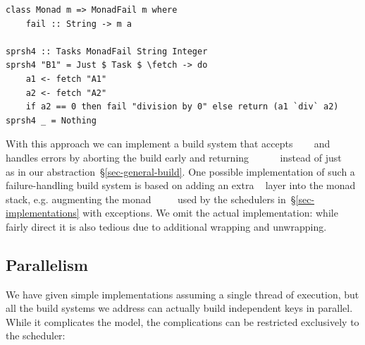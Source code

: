\vspace{1mm}
\begin{verbatim}
class Monad m => MonadFail m where
    fail :: String -> m a

sprsh4 :: Tasks MonadFail String Integer
sprsh4 "B1" = Just $ Task $ \fetch -> do
    a1 <- fetch "A1"
    a2 <- fetch "A2"
    if a2 == 0 then fail "division by 0" else return (a1 `div` a2)
sprsh4 _ = Nothing
\end{verbatim}
\vspace{1mm}

\noindent
With this approach we can implement a build system that accepts
~~~ and handles errors by aborting the
build early and returning
~~~~~ instead of just
~~~ as in our 
abstraction~\S\ref{sec-general-build}. One possible implementation of such a
failure-handling build system is based on adding an extra
~ layer into the monad stack, e.g. augmenting the monad
~~~~ used by the schedulers
in~\S\ref{sec-implementations} with exceptions. We omit the actual
implementation: while fairly direct it is also tedious due to additional
wrapping and unwrapping.


\subsection{Parallelism}\label{sec-parallelism}

We have given simple implementations assuming a single thread of execution,
but all the build systems we address can actually build independent keys in
parallel. While it complicates the model, the complications can be restricted
exclusively to the scheduler:


